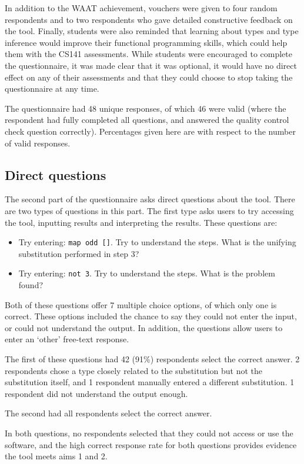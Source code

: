 \documentclass[a4paper,fleqn,oneside,12pt]{report}
\begin{document}
In addition to the WAAT achievement, vouchers were given to four random respondents and to two respondents who gave detailed constructive feedback on the tool. Finally, students were also reminded that learning about types and type inference would improve their functional programming skills, which could help them with the CS141 assessments. While students were encouraged to complete the questionnaire, it was made clear that it was optional, it would have no direct effect on any of their assessments and that they could choose to stop taking the questionnaire at any time.

The questionnaire had 48 unique responses, of which 46 were valid (where the respondent had fully completed all questions, and answered the quality control check question correctly). Percentages given here are with respect to the number of valid responses.
\subsection{Direct questions}\label{id:h.abykou9pzwwh}
The second part of the questionnaire asks direct questions about the tool. There are two types of questions in this part. The first type asks users to try accessing the tool, inputting results and interpreting the results. These questions are:
\begin{itemize}
  \item Try entering: \texttt{map odd []}. Try to understand the steps. What is the unifying substitution performed in step 3?
  \item Try entering: \texttt{not 3}. Try to understand the steps. What is the problem found?
\end{itemize}
Both of these questions offer 7 multiple choice options, of which only one is correct. These options included the chance to say they could not enter the input, or could not understand the output. In addition, the questions allow users to enter an ‘other’ free-text response.

The first of these questions had 42 (91\%) respondents select the correct answer. 2 respondents chose a type closely related to the substitution but not the substitution itself, and 1 respondent manually entered a different substitution. 1 respondent did not understand the output enough.

The second had all respondents select the correct answer.

In both questions, no respondents selected that they could not access or use the software, and the high correct response rate for both questions provides evidence the tool meets aims 1 and 2.
\end{document}
